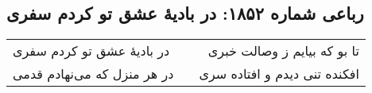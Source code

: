 \begin{center}
\section*{رباعی شماره ۱۸۵۲: در بادیهٔ عشق تو کردم سفری}
\label{sec:1852}
\begin{longtable}{l p{0.5cm} r}
در بادیهٔ عشق تو کردم سفری
&&
تا بو که بیایم ز وصالت خبری
\\
در هر منزل که می‌نهادم قدمی
&&
افکنده تنی دیدم و افتاده سری
\\
\end{longtable}
\end{center}
